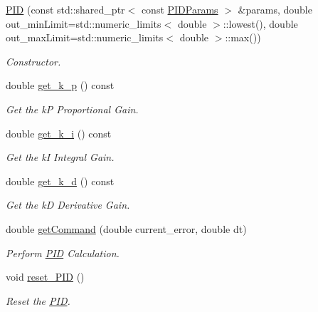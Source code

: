 \begin{DoxyCompactItemize}
\item 
\hyperlink{classackermann_1_1_p_i_d_a98e96878fcc3373f22d783b78c7cf0d9}{P\+ID} (const std\+::shared\+\_\+ptr$<$ const \hyperlink{structackermann_1_1_p_i_d_params}{P\+I\+D\+Params} $>$ \&params, double out\+\_\+min\+Limit=std\+::numeric\+\_\+limits$<$ double $>$\+::lowest(), double out\+\_\+max\+Limit=std\+::numeric\+\_\+limits$<$ double $>$\+::max())
\begin{DoxyCompactList}\small\item\em Constructor. \end{DoxyCompactList}\item 
double \hyperlink{classackermann_1_1_p_i_d_a3257bf60c93eb2a3b18b48a40a480b2d}{get\+\_\+k\+\_\+p} () const
\begin{DoxyCompactList}\small\item\em Get the kP Proportional Gain. \end{DoxyCompactList}\item 
double \hyperlink{classackermann_1_1_p_i_d_a9845f8af09db7e901d319c53e4e43268}{get\+\_\+k\+\_\+i} () const
\begin{DoxyCompactList}\small\item\em Get the kI Integral Gain. \end{DoxyCompactList}\item 
double \hyperlink{classackermann_1_1_p_i_d_aaf565af4f72abcf148b8abe8880df6c3}{get\+\_\+k\+\_\+d} () const
\begin{DoxyCompactList}\small\item\em Get the kD Derivative Gain. \end{DoxyCompactList}\item 
double \hyperlink{classackermann_1_1_p_i_d_a6286415d935d49dceba543deb4356b42}{get\+Command} (double current\+\_\+error, double dt)
\begin{DoxyCompactList}\small\item\em Perform \hyperlink{classackermann_1_1_p_i_d}{P\+ID} Calculation. \end{DoxyCompactList}\item 
void \hyperlink{classackermann_1_1_p_i_d_a1f2e47eb9958ec5d1887bf7c5f82175a}{reset\+\_\+\+P\+ID} ()
\begin{DoxyCompactList}\small\item\em Reset the \hyperlink{classackermann_1_1_p_i_d}{P\+ID}. \end{DoxyCompactList}\end{DoxyCompactItemize}


